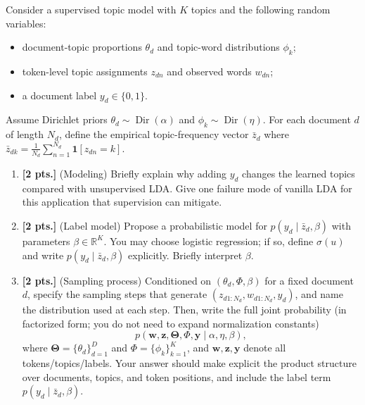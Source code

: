 \documentclass[11pt,a4paper]{article}
\begin{document}
Consider a supervised topic model with $K$ topics and the following random variables:
\begin{itemize}
    \item document-topic proportions $\theta_d$ and topic-word distributions $\phi_k$;
    \item token-level topic assignments $z_{dn}$ and observed words $w_{dn}$;
    \item a document label $y_d \in \{0, 1\}$.
\end{itemize}
Assume Dirichlet priors $\theta_d \sim \operatorname{Dir}(\alpha)$ and $\phi_k \sim \operatorname{Dir}(\eta)$. For each document $d$ of length $N_d$, define the empirical topic-frequency vector $\bar{z}_d$ where $\bar{z}_{dk} = \frac{1}{N_d} \sum_{n=1}^{N_d} \mathbf{1}[z_{dn} = k]$.
\begin{enumerate}[label=(\alph*)]
    \item \textbf{[2 pts.]} (Modeling) Briefly explain why adding $y_d$ changes the learned topics compared with unsupervised LDA. Give one failure mode of vanilla LDA for this application that supervision can mitigate.
    \item \textbf{[2 pts.]} (Label model) Propose a probabilistic model for $p(y_d \mid \bar{z}_d, \beta)$ with parameters $\beta \in \mathbb{R}^{K}$. You may choose logistic regression; if so, define $\sigma(u)$ and write $p(y_d \mid \bar{z}_d, \beta)$ explicitly. Briefly interpret $\beta$.
    \item \textbf{[2 pts.]} (Sampling process) Conditioned on $(\theta_d, \Phi, \beta)$ for a fixed document $d$, specify the sampling steps that generate $(z_{d1:N_d}, w_{d1:N_d}, y_d)$, and name the distribution used at each step. Then, write the full joint probability (in factorized form; you do not need to expand normalization constants)
    \[
    p(\mathbf{w}, \mathbf{z}, \boldsymbol{\Theta}, \Phi, \mathbf{y} \mid \alpha, \eta, \beta),
    \]
    where $\boldsymbol{\Theta} = \{\theta_d\}_{d=1}^{D}$ and $\Phi = \{\phi_k\}_{k=1}^{K}$, and $\mathbf{w}, \mathbf{z}, \mathbf{y}$ denote all tokens/topics/labels. Your answer should make explicit the product structure over documents, topics, and token positions, and include the label term $p(y_d \mid \bar{z}_d, \beta)$.
\end{enumerate}
\end{document}
